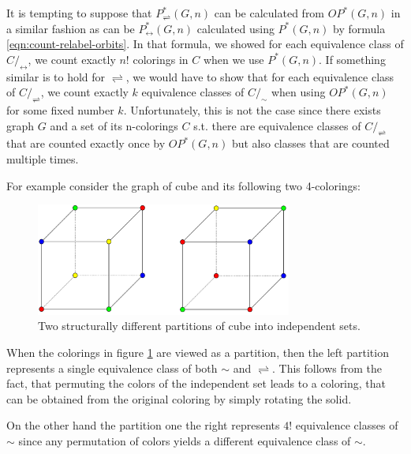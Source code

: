 \begin{highlight}
It is tempting to suppose that $P^*_{\rightleftharpoons}(G,n)$ can be calculated from $OP^*(G,n)$ in a similar fashion as can be $P^*_{\leftrightarrow}(G,n)$ calculated using $P^*(G,n)$ by formula \ref{eqn:count-relabel-orbits}. In that formula, we showed for each equivalence class of $C/_\leftrightarrow$, we count exactly $n!$ colorings in $C$ when we use $P^*(G,n)$. If something similar is to hold for $\rightleftharpoons$, we would have to show that for each equivalence class of $C/_\rightleftharpoons$, we count exactly $k$ equivalence classes of $C/_\sim$ when using $OP^*(G,n)$ for some fixed number $k$. Unfortunately, this is not the case since there exists graph $G$ and a set of its n-colorings $C$ s.t. there are equivalence classes of $C/_\rightleftharpoons$ that are counted exactly once by $OP^*(G,n)$ but also classes that are counted multiple times.

For example consider the graph of cube and its following two 4-colorings:

\begin{figure}[H]
    \centering
    \includegraphics[width=0.75\textwidth]{Resources/Figs/example_diff_rel-aut_class_sizes.pdf}
    \caption{Two structurally different partitions of cube into independent sets.}
    \label{fig:example-cube-4-clrings-diff-classes}
\end{figure}

When the colorings in figure \ref{fig:example-cube-4-clrings-diff-classes} are viewed as a partition, then the left partition represents a single equivalence class of both $\sim$ and $\rightleftharpoons$. This follows from the fact, that permuting the colors of the independent set leads to a coloring, that can be obtained from the original coloring by simply rotating the solid.

On the other hand the partition one the right represents $4!$ equivalence classes of $\sim$ since any permutation of colors yields a different equivalence class of $\sim$.



\end{highlight}
